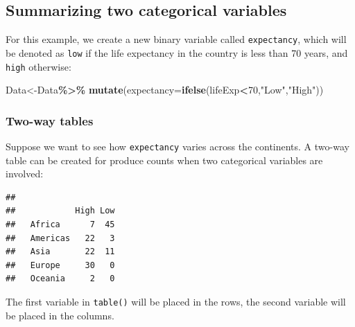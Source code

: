 \documentclass[
]{book}
\newenvironment{Shaded}{\begin{snugshade}}{\end{snugshade}}
\newcommand{\AttributeTok}[1]{\textcolor[rgb]{0.13,0.29,0.53}{#1}}
\newcommand{\DecValTok}[1]{\textcolor[rgb]{0.00,0.00,0.81}{#1}}
\newcommand{\DocumentationTok}[1]{\textcolor[rgb]{0.56,0.35,0.01}{\textbf{\textit{#1}}}}
\newcommand{\FunctionTok}[1]{\textcolor[rgb]{0.13,0.29,0.53}{\textbf{#1}}}
\newcommand{\NormalTok}[1]{#1}
\newcommand{\OtherTok}[1]{\textcolor[rgb]{0.56,0.35,0.01}{#1}}
\newcommand{\SpecialCharTok}[1]{\textcolor[rgb]{0.81,0.36,0.00}{\textbf{#1}}}
\newcommand{\StringTok}[1]{\textcolor[rgb]{0.31,0.60,0.02}{#1}}
\begin{document}
\hypertarget{summarizing-two-categorical-variables}{%
\subsection{Summarizing two categorical variables}\label{summarizing-two-categorical-variables}}

For this example, we create a new binary variable called \texttt{expectancy}, which will be denoted as \texttt{low} if the life expectancy in the country is less than 70 years, and \texttt{high} otherwise:

\begin{Shaded}
\begin{Highlighting}[]
\NormalTok{Data}\OtherTok{\textless{}{-}}\NormalTok{Data}\SpecialCharTok{\%\textgreater{}\%}
  \FunctionTok{mutate}\NormalTok{(}\AttributeTok{expectancy=}\FunctionTok{ifelse}\NormalTok{(lifeExp}\SpecialCharTok{\textless{}}\DecValTok{70}\NormalTok{,}\StringTok{"Low"}\NormalTok{,}\StringTok{"High"}\NormalTok{))}
\end{Highlighting}
\end{Shaded}

\hypertarget{two-way-tables}{%
\subsubsection{Two-way tables}\label{two-way-tables}}

Suppose we want to see how \texttt{expectancy} varies across the continents. A two-way table can be created for produce counts when two categorical variables are involved:

\begin{Shaded}
\end{Shaded}

\begin{verbatim}
##           
##            High Low
##   Africa      7  45
##   Americas   22   3
##   Asia       22  11
##   Europe     30   0
##   Oceania     2   0
\end{verbatim}

The first variable in \texttt{table()} will be placed in the rows, the second variable will be placed in the columns.
\end{document}
